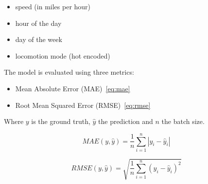 \begin{itemize}
    \item speed (in miles per hour)
    \item hour of the day
    \item day of the week
    \item locomotion mode (hot encoded)
\end{itemize}
\vspace{1em}

The model is evaluated using three metrics:
\begin{itemize}
    \item Mean Absolute Error (MAE)~\eqref{eq:mae}
    \item Root Mean Squared Error (RMSE)~\eqref{eq:rmse}
\end{itemize}
Where $y$ is the ground truth, $\hat{y}$ the prediction and $n$ the batch size.

\begin{equation}
    MAE(y, \hat{y}) = \frac{1}{n} \sum_{i=1}^{n} \left| y_i - \hat{y}_i \right|\label{eq:mae}
\end{equation}

\begin{equation}
    RMSE(y, \hat{y}) = \sqrt{\frac{1}{n} \sum_{i=1}^{n} \left( y_i - \hat{y}_i \right)^2}\label{eq:rmse}
\end{equation}
\vspace{1em}